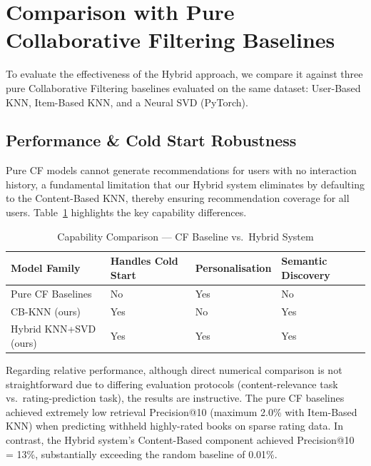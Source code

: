 \documentclass[12pt, a4paper]{article}
\begin{document}
\newpage
\section{Comparison with Pure Collaborative Filtering Baselines}
\label{sec:comparison}

To evaluate the effectiveness of the Hybrid approach, we compare it against three pure Collaborative Filtering baselines evaluated on the same dataset: User-Based KNN, Item-Based KNN, and a Neural SVD (PyTorch). 

\subsection{Performance \& Cold Start Robustness}

Pure CF models cannot generate recommendations for users with no interaction history,
a fundamental limitation that our Hybrid system eliminates by defaulting to the
Content-Based KNN, thereby ensuring recommendation coverage for all users.
Table~\ref{tab:full_compare} highlights the key capability differences.

\begin{table}[H]
  \centering
  \caption{Capability Comparison --- CF Baseline vs.\ Hybrid System}
  \label{tab:full_compare}
  \begin{tabular}{|p{3cm}|p{3cm}|p{3.2cm}|p{3cm}|}
    \hline
    \textbf{Model Family} & \textbf{Handles Cold Start} & \textbf{Personalisation} & \textbf{Semantic Discovery} \\
    \hline
    Pure CF Baselines & No & Yes & No \\
    \hline
    CB-KNN (ours) & Yes & No & Yes \\
    \hline
    Hybrid KNN+SVD (ours)& Yes & Yes & Yes \\
    \hline
  \end{tabular}
\end{table}

Regarding relative performance, although direct numerical comparison is not straightforward
due to differing evaluation protocols (content-relevance task vs.\ rating-prediction task),
the results are instructive.
The pure CF baselines achieved extremely low retrieval Precision@10
(maximum 2.0\% with Item-Based KNN) when predicting withheld highly-rated books
on sparse rating data.
In contrast, the Hybrid system's Content-Based component achieved Precision@10 = 13\%,
substantially exceeding the random baseline of 0.01\%.
\end{document}
